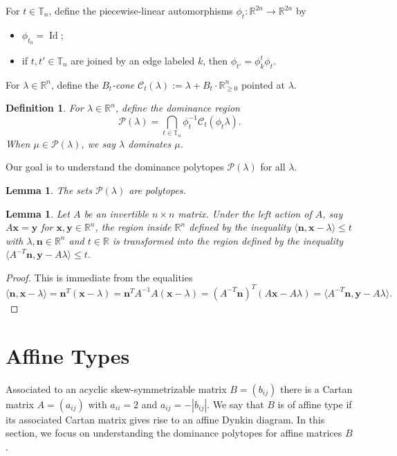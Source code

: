 \documentclass{amsart}
\newtheorem{definition}[theorem]{Definition}
\newtheorem{lemma}[theorem]{Lemma}
\numberwithin{theorem}{section}
\newcommand{\bfn}{\boldsymbol{n}}
\newcommand{\bfx}{\boldsymbol{x}}
\newcommand{\bfy}{\boldsymbol{y}}
\newcommand{\cC}{\mathcal{C}}
\newcommand{\cP}{\mathcal{P}}
\newcommand{\RR}{\mathbb{R}}
\newcommand{\TT}{\mathbb{T}}
\newcommand{\Id}{\operatorname{Id}}
\begin{document}
  For $t\in\TT_n$, define the piecewise-linear automorphisms $\phi_t:\RR^{2n}\to\RR^{2n}$ by
  \begin{itemize}
    \item $\phi_{t_0}=\Id$;
    \item if $t,t'\in\TT_n$ are joined by an edge labeled $k$, then $\phi_{t'}=\phi^t_k \phi_t$.
  \end{itemize}

  
  For $\lambda\in\RR^n$, define the \emph{$B_t$-cone} $\cC_t(\lambda):=\lambda+B_t\cdot\RR_{\ge0}^n$ pointed at $\lambda$.
  \begin{definition}
    For $\lambda\in\RR^n$, define the \emph{dominance region} 
    \[
      \cP(\lambda) = \bigcap_{t\in\TT_n} \phi_t^{-1} \cC_t(\phi_t \lambda).
    \]
    When $\mu\in\cP(\lambda)$, we say \emph{$\lambda$ dominates $\mu$}.
  \end{definition}
  Our goal is to understand the dominance polytopes $\cP(\lambda)$ for all $\lambda$.
  \begin{lemma}
    The sets $\cP(\lambda)$ are polytopes.
  \end{lemma}


  \begin{lemma}
    \label{le:transformed inequalities}
    Let $A$ be an invertible $n\times n$ matrix.
    Under the left action of $A$, say $A\bfx=\bfy$ for $\bfx,\bfy\in\RR^n$, the region inside $\RR^n$ defined by the inequality $\langle\bfn,\bfx-\lambda\rangle\le t$ with $\lambda,\bfn\in\RR^n$ and $t\in\RR$ is transformed into the region defined by the inequality $\langle A^{-T}\bfn,\bfy-A\lambda\rangle\le t$.
  \end{lemma}
  \begin{proof}
    This is immediate from the equalities
    \[
      \langle\bfn,\bfx-\lambda\rangle=\bfn^T(\bfx-\lambda)=\bfn^TA^{-1}A(\bfx-\lambda)=(A^{-T}\bfn)^T(A\bfx-A\lambda)=\langle A^{-T}\bfn,\bfy-A\lambda\rangle.
    \]
  \end{proof}


  \section{Affine Types}
  Associated to an acyclic skew-symmetrizable matrix $B=(b_{ij})$ there is a Cartan matrix $A=(a_{ij})$ with $a_{ii}=2$ and $a_{ij}=-|b_{ij}|$.
  We say that $B$ is of affine type if its associated Cartan matrix gives rise to an affine Dynkin diagram.
  In this section, we focus on understanding the dominance polytopes for affine matrices $B$.
\end{document}
